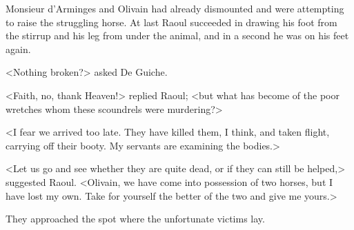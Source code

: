 Monsieur d'Arminges and Olivain had already dismounted and were attempting to raise the struggling horse. At last Raoul succeeded in drawing his foot from the stirrup and his leg from under the animal, and in a second he was on his feet again.

<Nothing broken?> asked De Guiche.

<Faith, no, thank Heaven!> replied Raoul; <but what has become of the poor wretches whom these scoundrels were murdering?>

<I fear we arrived too late. They have killed them, I think, and taken flight, carrying off their booty. My servants are examining the bodies.>

<Let us go and see whether they are quite dead, or if they can still be helped,> suggested Raoul. <Olivain, we have come into possession of two horses, but I have lost my own. Take for yourself the better of the two and give me yours.>

They approached the spot where the unfortunate victims lay. 